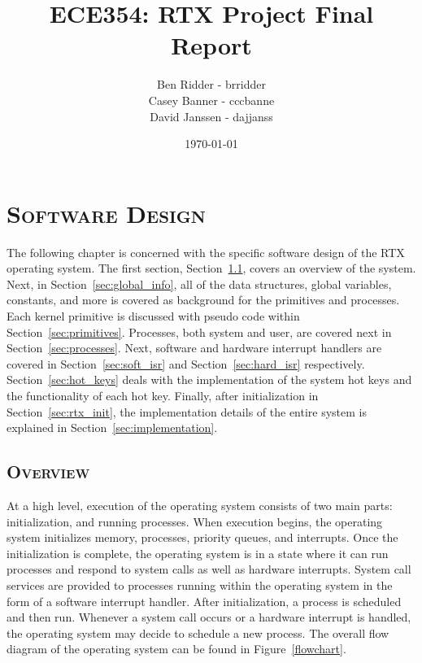 \documentclass[oneside]{report}
\begin{document}
\lstset{language=C, 
        frame=single, 
        breaklines=true,
        basicstyle=\small\ttfamily,
        columns=fullflexible}


\title{ECE354: RTX Project Final Report}
\author{Ben Ridder - brridder \\
Casey Banner - cccbanne \\
David Janssen - dajjanss }
\date{\today}

\maketitle

\tableofcontents
\listoftables
\lstlistoflistings

\chapter{\textsc{Software Design}}
The following chapter is concerned with the specific software design of the
RTX operating system. The first section, Section~\ref{sec:overview}, covers an
overview of the system. Next, in Section~\ref{sec:global_info}, all of the data
structures, global variables, constants, and more is covered as background for
the primitives and processes. Each kernel primitive is discussed with pseudo
code within Section~\ref{sec:primitives}. Processes, both system and user, are
covered next in Section~\ref{sec:processes}. Next, software and hardware
interrupt handlers are covered in Section~\ref{sec:soft_isr} and
Section~\ref{sec:hard_isr} respectively. Section~\ref{sec:hot_keys} deals with
the implementation of the system hot keys and the functionality of each hot
key. Finally, after initialization in Section~\ref{sec:rtx_init}, the implementation
details of the entire system is explained in Section~\ref{sec:implementation}.

\section{\textsc{Overview}}
\label{sec:overview}

At a high level, execution of the operating system consists of two
main parts: initialization, and running processes. When execution
begins, the operating system initializes memory, processes, priority
queues, and interrupts. Once the initialization is complete, the
operating system is in a state where it can run processes and respond
to system calls as well as hardware interrupts. System call services
are provided to processes running within the operating system in the
form of a software interrupt handler. After initialization, a process
is scheduled and then run. Whenever a system call occurs or a hardware
interrupt is handled, the operating system may decide to schedule a
new process. The overall flow diagram of the operating system can be
found in Figure~\ref{flowchart}.
\end{document}
